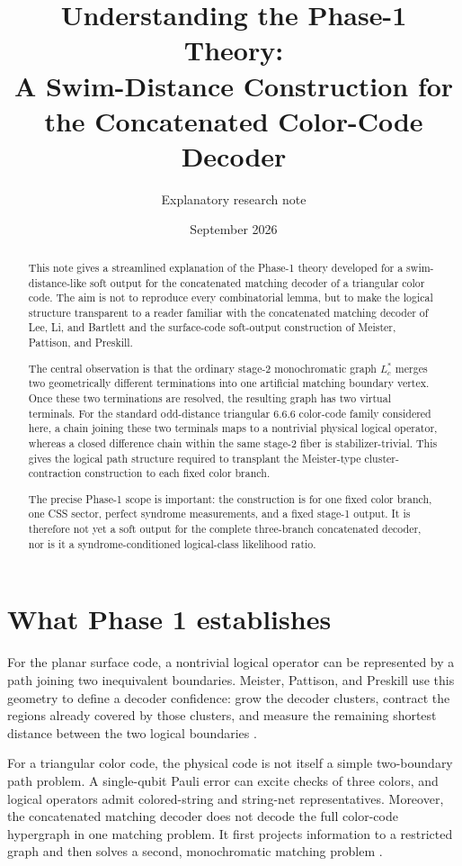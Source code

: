 \documentclass[11pt]{article}
\title{Understanding the Phase-1 Theory:\\
A Swim-Distance Construction for the Concatenated Color-Code Decoder}
\author{Explanatory research note}
\date{September 2026}
\begin{document}
\maketitle

\begin{abstract}
This note gives a streamlined explanation of the Phase-1 theory developed for
a swim-distance-like soft output for the concatenated matching decoder of a
triangular color code. The aim is not to reproduce every combinatorial lemma,
but to make the logical structure transparent to a reader familiar with the
concatenated matching decoder of Lee, Li, and Bartlett and the surface-code
soft-output construction of Meister, Pattison, and Preskill.

The central observation is that the ordinary stage-2 monochromatic graph
$L_c^*$ merges two geometrically different terminations into one artificial
matching boundary vertex. Once these two terminations are resolved, the
resulting graph has two virtual terminals. For the standard odd-distance
triangular 6.6.6 color-code family considered here, a chain joining these two
terminals maps to a nontrivial physical logical operator, whereas a closed
difference chain within the same stage-2 fiber is stabilizer-trivial. This
gives the logical path structure required to transplant the Meister-type
cluster-contraction construction to each fixed color branch.

The precise Phase-1 scope is important: the construction is for one fixed
color branch, one CSS sector, perfect syndrome measurements, and a fixed
stage-1 output. It is therefore not yet a soft output for the complete
three-branch concatenated decoder, nor is it a syndrome-conditioned
logical-class likelihood ratio.
\end{abstract}

\section{What Phase 1 establishes}

For the planar surface code, a nontrivial logical operator can be represented
by a path joining two inequivalent boundaries. Meister, Pattison, and Preskill
use this geometry to define a decoder confidence: grow the decoder clusters,
contract the regions already covered by those clusters, and measure the
remaining shortest distance between the two logical boundaries \cite{Meister}.

For a triangular color code, the physical code is not itself a simple
two-boundary path problem. A single-qubit Pauli error can excite checks of
three colors, and logical operators admit colored-string and string-net
representatives. Moreover, the concatenated matching decoder does not decode
the full color-code hypergraph in one matching problem. It first projects
information to a restricted graph and then solves a second, monochromatic
matching problem \cite{Lee}.
\end{document}
